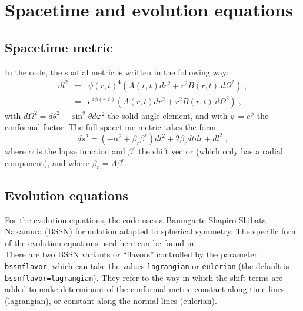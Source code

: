 \documentclass[12pt]{article}
\begin{document}

\setcounter{equation}{0}
\section{Spacetime and evolution equations}

\subsection{Spacetime metric}

In the code, the spatial metric is written in the following way:\\
\begin{eqnarray}
dl^2 &=& \psi(r,t)^4 \left( A(r,t) dr^2 + r^2 B(r,t) \: d\Omega^2 \right) \; , \nonumber \\
&=& e^{4 \phi(r,t)} \left( A(r,t) dr^2 + r^2 B(r,t) \: d\Omega^2 \right) \; ,
\label{eq:metric}
\end{eqnarray}
with $d\Omega^2=d\theta^2 + \sin^2 \theta d\varphi^2$ the solid angle
element, and with $\psi = e^\phi$ the conformal factor. The full
spacetime metric takes the form: \\
\begin{equation}
ds^2 = \left(-\alpha^{2} + \beta_{r}\beta^{r} \right) dt^2
+ 2 \beta_{r} dt dr + dl^2 \; ,
\end{equation}
where $\alpha$ is the lapse function and $\beta^{r}$ the shift vector
(which only has a radial component), and where $\beta_r = A \beta^r$. \\


\subsection{Evolution equations}

For the evolution equations, the code uses a
Baumgarte-Shapiro-Shibata-Nakamura (BSSN) formulation adapted to
spherical symmetry.  The specific form of the evolution equations used
here can be found in~\cite{Alcubierre11}. \\

There are two BSSN variants or ``flavors'' controlled by the
parameter \texttt{bssnflavor}, which can take the values
\texttt{lagrangian} or \texttt{eulerian} (the
default is \texttt{bssnflavor=lagrangian}). They refer to the way in which the
shift terms are added to make determinant of the conformal metric
constant along time-lines (lagrangian), or constant along the
normal-lines (eulerian). \\
\end{document}
